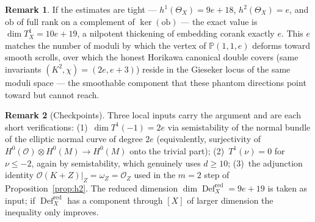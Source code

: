 \documentclass[11pt]{amsart}
\theoremstyle{definition}
\newtheorem{remark}{Remark}
\DeclareMathOperator{\Def}{Def}
\newcommand{\cO}{\mathcal{O}}
\newcommand{\PP}{\mathbb{P}}
\begin{document}
\begin{remark}
If the estimates are tight --- $h^1(\Theta_X)=9e+18$, $h^2(\Theta_X)=e$, and
$\mathrm{ob}$ of full rank on a complement of $\ker(\mathrm{ob})$ --- the exact
value is $\dim T^1_X=10e+19$, a nilpotent thickening of embedding corank exactly
$e$. This $e$ matches the number of moduli by which the vertex of $\PP(1,1,e)$
deforms toward smooth scrolls, over which the honest Horikawa canonical double
covers (same invariants $(K^2,\chi)=(2e,e+3)$) reside in the Gieseker locus of
the same moduli space --- the smoothable component that these phantom directions
point toward but cannot reach.
\end{remark}

\begin{remark}[Checkpoints]
Three local inputs carry the argument and are each short verifications:
(1)\ $\dim T^1(-1)=2e$ via semistability of the normal bundle of the elliptic
normal curve of degree $2e$ (equivalently, surjectivity of
$H^0(\cO)\otimes H^0(M)\to H^0(M)$ onto the trivial part);
(2)\ $T^1(\nu)=0$ for $\nu\le-2$, again by semistability, which genuinely uses
$d\ge10$;
(3)\ the adjunction identity $\cO(K+Z)|_Z=\omega_Z=\cO_Z$ used in the $m=2$ step
of Proposition~\ref{prop:h2}.
The reduced dimension $\dim\Def_X^{\mathrm{red}}=9e+19$ is taken as input; if
$\Def_X^{\mathrm{red}}$ has a component through $[X]$ of larger dimension the
inequality only improves.
\end{remark}
\end{document}
